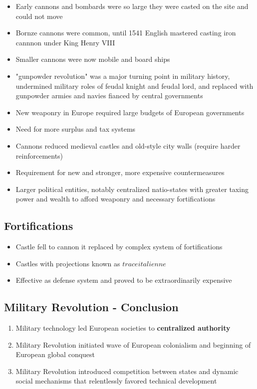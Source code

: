 \documentclass{article}
\begin{document}
\begin{itemize}
  \item Early cannons and bombards were so large they were casted on the site and could not move
  \item Bornze cannons were common, until 1541 English mastered casting iron cannnon under
    King Henry VIII
  \item Smaller cannons were now mobile and board ships
  \item "gunpowder revolution" was a major turning point in military history,
    undermined military roles of feudal knight and feudal lord, and replaced
    with gunpowder armies and navies fianced by central governments
  \item New weaponry in Europe required large budgets of European governments
  \item Need for more surplus and tax systems
  \item Cannons reduced medieval castles and old-style city walls (require harder reinforcements)
  \item Requirement for new and stronger, more expensive countermeasures
  \item Larger political entities, notably centralized natio-states
    with greater taxing power and wealth to afford weaponry and necessary fortifications
\end{itemize}

\subsection{Fortifications}
\begin{itemize}
  \item Castle fell to cannon it replaced by complex system of fortifications
  \item Castles with projections known as $trace italienne$
  \item Effective as defense system and proved to be extraordinarily expensive
\end{itemize}

\subsection{Military Revolution - Conclusion}
\begin{enumerate}
  \item Military technology led European societies to \textbf{centralized authority}
  \item Military Revolution initiated wave of European colonialism and beginning of European global conquest
  \item  Military Revolution introduced competition between states and dynamic social mechanisms that relentlessly favored technical
    development
\end{enumerate}
\end{document}
